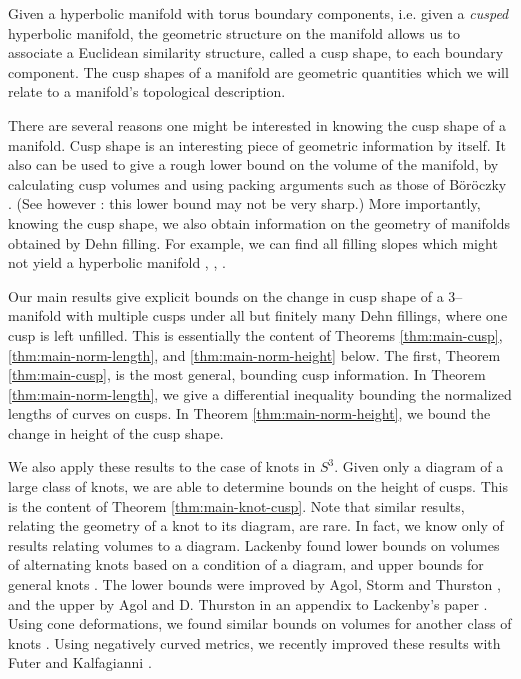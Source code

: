 Given a hyperbolic manifold with torus boundary components, i.e. given
a \emph{cusped} hyperbolic manifold, the geometric structure on the
manifold allows us to associate a Euclidean similarity structure,
called a cusp shape, to each boundary component.  The cusp shapes of a
manifold are geometric quantities which we will relate to a manifold's
topological description.

There are several reasons one might be interested in knowing the cusp
shape of a manifold.  Cusp shape is an interesting piece of geometric
information by itself.  It also can be used to give a rough lower
bound on the volume of the manifold, by calculating cusp volumes and
using packing arguments such as those of B{\"o}r{\"o}czky
\cite{boroczky}.  (See however \cite{eudave-munoz-luecke}: this lower
bound may not be very sharp.)  More importantly, knowing the cusp
shape, we also obtain information on the geometry of manifolds
obtained by Dehn filling.  For example, we can find all filling slopes
which might not yield a hyperbolic manifold \cite{agol:bounds},
\cite{lackenby:surg}, \cite{hk:univ}.

Our main results give explicit bounds on the change in cusp shape of a
3--manifold with multiple cusps under all but finitely many Dehn
fillings, where one cusp is left unfilled.  This is essentially the
content of Theorems \ref{thm:main-cusp}, \ref{thm:main-norm-length},
and \ref{thm:main-norm-height} below.  The first, Theorem
\ref{thm:main-cusp}, is the most general, bounding cusp information.
In Theorem \ref{thm:main-norm-length}, we give a differential
inequality bounding the normalized lengths of curves on cusps.  In
Theorem \ref{thm:main-norm-height}, we bound the change in height of
the cusp shape.

We also apply these results to the case of knots in $S^3$.  Given only
a diagram of a large class of knots, we are able to determine bounds
on the height of cusps.  This is the content of Theorem
\ref{thm:main-knot-cusp}.  Note that similar results, relating the
geometry of a knot to its diagram, are rare.  In fact, we know only of
results relating volumes to a diagram.  Lackenby found lower bounds on
volumes of alternating knots based on a condition of a diagram, and
upper bounds for general knots \cite{lackenby:alt-volume}.  The lower
bounds were improved by Agol, Storm and Thurston \cite{ast:volumes},
and the upper by Agol and D. Thurston in an appendix to Lackenby's
paper \cite{lackenby:alt-volume}.  Using cone deformations, we found
similar bounds on volumes for another class of knots
\cite{purcell:volume}.  Using negatively curved metrics, we recently
improved these results with Futer and Kalfagianni \cite{fkp:volumes}.


